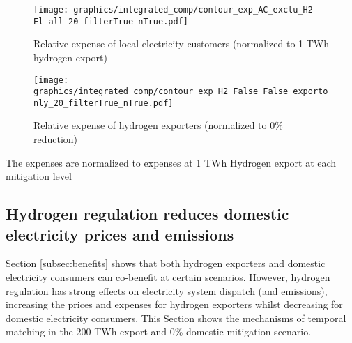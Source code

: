 \begin{figure*}[h!]
    \centering
    \begin{subfigure}[b]{0.49\linewidth}
        \centering
        \texttt{[image: graphics/integrated\_comp/contour\_exp\_AC\_exclu\_H2 El\_all\_20\_filterTrue\_nTrue.pdf]}
        \caption{Relative expense of local electricity customers (normalized to 1 TWh hydrogen export)}
        \label{fig:expense_ac}
    \end{subfigure}
    \hfill
    \begin{subfigure}[b]{0.49\linewidth}
        \centering
        \texttt{[image: graphics/integrated\_comp/contour\_exp\_H2\_False\_False\_exportonly\_20\_filterTrue\_nTrue.pdf]}
        \caption{Relative expense of hydrogen exporters (normalized to 0\% \co reduction)}
        \label{fig:expense_h2}
    \end{subfigure}
    \hfill
    \caption{  
    Expenses of local electricity consumers (\ref{fig:expense_ac}) and hydrogen exporters (\ref{fig:expense_h2}),
    normalized to expenses at 1 TWh hydrogen export (\ref{fig:expense_ac}) and
    to 0\% \co reduction (\ref{fig:expense_h2})
    at each mitigation level. Local electricity consumers profit from increasing hydrogen exports, especially at low domestic mitigation and high exports. Hydrogen exporters profit from domestic mitigation at medium mitigation efforts.}
    \label{fig:expenses_default}
\end{figure*}


The expenses are normalized to expenses at 1 TWh Hydrogen export at each mitigation level

\subsection{Hydrogen regulation reduces domestic electricity prices and emissions}
\label{subsec:benefits_rule}

Section \ref{subsec:benefits} shows that both hydrogen exporters and domestic electricity consumers can co-benefit at certain scenarios. However, hydrogen regulation has strong effects on electricity system dispatch (and emissions), increasing the prices and expenses for hydrogen exporters whilst decreasing for domestic electricity consumers. This Section shows the mechanisms of temporal matching in the 200 TWh export and 0\% domestic mitigation scenario.

